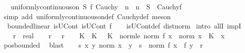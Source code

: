 \begin{isabellebody}
\ \ \ {\isachardoublequoteopen}{\isasymlbrakk}uniformly{\isacharunderscore}{\kern0pt}continuous{\isacharunderscore}{\kern0pt}on\ S\ f{\isacharsemicolon}{\kern0pt}\ Cauchy\ {\isasymsigma}{\isacharsemicolon}{\kern0pt}\ {\isasymAnd}n{\isachardot}{\kern0pt}\ {\isacharparenleft}{\kern0pt}{\isasymsigma}\ n{\isacharparenright}{\kern0pt}\ {\isasymin}\ S{\isasymrbrakk}\ {\isasymLongrightarrow}\ Cauchy{\isacharparenleft}{\kern0pt}f\ {\isasymcirc}\ {\isasymsigma}{\isacharparenright}{\kern0pt}{\isachardoublequoteclose}\isanewline
%
\isadelimproof
\ \ %
\endisadelimproof
%
\isatagproof
{}\isamarkupfalse%
\ {\isacharparenleft}{\kern0pt}simp\ add{\isacharcolon}{\kern0pt}\ uniformly{\isacharunderscore}{\kern0pt}continuous{\isacharunderscore}{\kern0pt}on{\isacharunderscore}{\kern0pt}def\ Cauchy{\isacharunderscore}{\kern0pt}def{\isacharparenright}{\kern0pt}\ meson%
\endisatagproof
{\isafoldproof}%
%
\isadelimproof
\isanewline
%
\endisadelimproof
\isanewline
{}\isamarkupfalse%
\ {\isacharparenleft}{\kern0pt}\ bounded{\isacharunderscore}{\kern0pt}linear{\isacharparenright}{\kern0pt}\ isUCont{\isacharcolon}{\kern0pt}\ {\isachardoublequoteopen}isUCont\ f{\isachardoublequoteclose}\isanewline
%
\isadelimproof
\ \ %
\endisadelimproof
%
\isatagproof
{}\isamarkupfalse%
\ isUCont{\isacharunderscore}{\kern0pt}def\ dist{\isacharunderscore}{\kern0pt}norm\isanewline
{}\isamarkupfalse%
\ {\isacharparenleft}{\kern0pt}intro\ allI\ impI{\isacharparenright}{\kern0pt}\isanewline
\ \ \isamarkupfalse%
\ r\ {\isacharcolon}{\kern0pt}{\isacharcolon}{\kern0pt}\ real\isanewline
\ \ \isamarkupfalse%
\ r{\isacharcolon}{\kern0pt}\ {\isachardoublequoteopen}{}\ {\isacharless}{\kern0pt}\ r{\isachardoublequoteclose}\isanewline
\ \ \isamarkupfalse%
\ K\ \ K{\isacharcolon}{\kern0pt}\ {\isachardoublequoteopen}{}\ {\isacharless}{\kern0pt}\ K{\isachardoublequoteclose}\ \ norm{\isacharunderscore}{\kern0pt}le{\isacharcolon}{\kern0pt}\ {\isachardoublequoteopen}norm\ {\isacharparenleft}{\kern0pt}f\ x{\isacharparenright}{\kern0pt}\ {\isasymle}\ norm\ x\ {\isacharasterisk}{\kern0pt}\ K{\isachardoublequoteclose}\ \ x\isanewline
\ \ \ \ \isamarkupfalse%
\ pos{\isacharunderscore}{\kern0pt}bounded\ \isamarkupfalse%
\ blast\isanewline
\ \ \isamarkupfalse%
\ {\isachardoublequoteopen}{\isasymexists}s{\isachargreater}{\kern0pt}{}{\isachardot}{\kern0pt}\ {\isasymforall}x\ y{\isachardot}{\kern0pt}\ norm\ {\isacharparenleft}{\kern0pt}x\ {\isacharminus}{\kern0pt}\ y{\isacharparenright}{\kern0pt}\ {\isacharless}{\kern0pt}\ s\ {\isasymlongrightarrow}\ norm\ {\isacharparenleft}{\kern0pt}f\ x\ {\isacharminus}{\kern0pt}\ f\ y{\isacharparenright}{\kern0pt}\ {\isacharless}{\kern0pt}\ r{\isachardoublequoteclose}\isanewline

\end{isabellebody}
